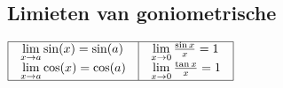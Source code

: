 \documentclass[a5paper]{article}
\begin{document}
\subsection{Limieten van goniometrische}

$\begin{array}{|l|l|}
\hline
\begin{array}{l}
\mathop {\lim }\limits_{x \to a} \sin (x) = \sin (a)\\
\mathop {\lim }\limits_{x \to a} \cos (x) = \cos (a)
\end{array}
&
\begin{array}{l}
\mathop {\lim }\limits_{x \to 0} \frac{{\sin x}}{x} = 1\\
\mathop {\lim }\limits_{x \to 0} \frac{{\tan x}}{x} = 1
\end{array} \\
\hline
\end{array}$
\normalsize

\newpage
\end{document}

